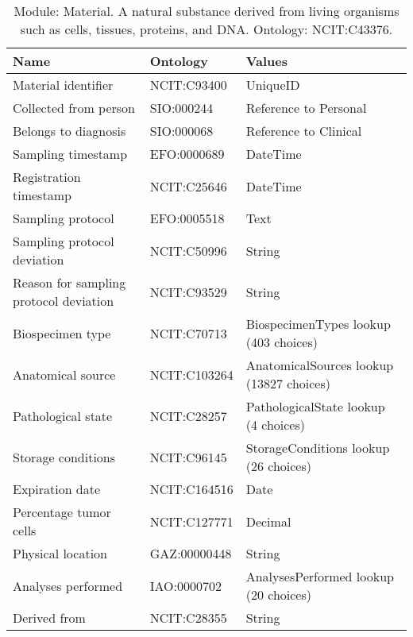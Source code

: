 \documentclass{article}
\begin{document}
\begin{table}[htb]
\begin{tabular}{lll}
Name & Ontology & Values \\
\hline
Material identifier & NCIT:C93400 & UniqueID \\
Collected from person & SIO:000244 & Reference to Personal \\
Belongs to diagnosis & SIO:000068 & Reference to Clinical \\
Sampling timestamp & EFO:0000689 & DateTime \\
Registration timestamp & NCIT:C25646 & DateTime \\
Sampling protocol & EFO:0005518 & Text \\
Sampling protocol deviation & NCIT:C50996 & String \\
Reason for sampling protocol deviation & NCIT:C93529 & String \\
Biospecimen type & NCIT:C70713 & BiospecimenTypes lookup (403 choices) \\
Anatomical source & NCIT:C103264 & AnatomicalSources lookup (13827 choices) \\
Pathological state & NCIT:C28257 & PathologicalState lookup (4 choices) \\
Storage conditions & NCIT:C96145 & StorageConditions lookup (26 choices) \\
Expiration date & NCIT:C164516 & Date \\
Percentage tumor cells & NCIT:C127771 & Decimal \\
Physical location & GAZ:00000448 & String \\
Analyses performed & IAO:0000702 & AnalysesPerformed lookup (20 choices) \\
Derived from & NCIT:C28355 & String \\
\hline
\end{tabular}
\caption[Module: Material]{\label{table:table7} Module: Material. A natural substance derived from living organisms such as cells, tissues, proteins, and DNA. Ontology: NCIT:C43376. }
\end{table}
\end{document}
